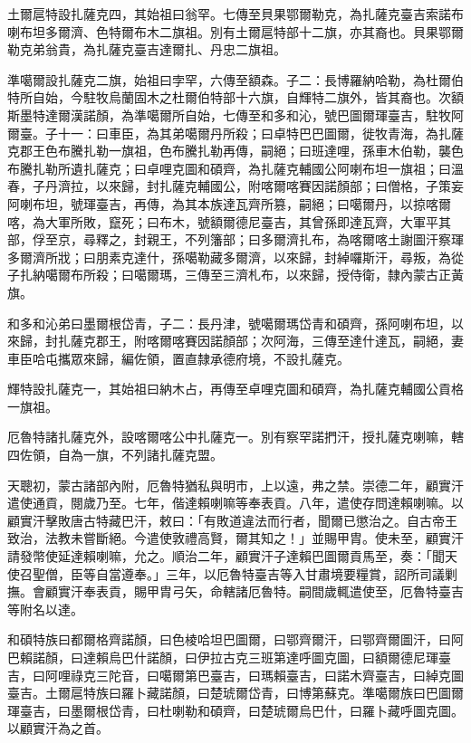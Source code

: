 \begin{pinyinscope}
土爾扈特設扎薩克四，其始祖曰翁罕。七傳至貝果鄂爾勒克，為扎薩克臺吉索諾布喇布坦多爾濟、色特爾布木二旗祖。別有土爾扈特部十二旗，亦其裔也。貝果鄂爾勒克弟翁貴，為扎薩克臺吉達爾扎、丹忠二旗祖。

準噶爾設扎薩克二旗，始祖曰孛罕，六傳至額森。子二：長博羅納哈勒，為杜爾伯特所自始，今駐牧烏蘭固木之杜爾伯特部十六旗，自輝特二旗外，皆其裔也。次額斯墨特達爾漢諾顏，為準噶爾所自始，七傳至和多和沁，號巴圖爾琿臺吉，駐牧阿爾臺。子十一：曰車臣，為其弟噶爾丹所殺；曰卓特巴巴圖爾，徙牧青海，為扎薩克郡王色布騰扎勒一旗祖，色布騰扎勒再傳，嗣絕；曰班達哩，孫車木伯勒，襲色布騰扎勒所遺扎薩克；曰卓哩克圖和碩齊，為扎薩克輔國公阿喇布坦一旗祖；曰溫春，子丹濟拉，以來歸，封扎薩克輔國公，附喀爾喀賽因諾顏部；曰僧格，子策妄阿喇布坦，號琿臺吉，再傳，為其本族達瓦齊所篡，嗣絕；曰噶爾丹，以掠喀爾喀，為大軍所敗，竄死；曰布木，號額爾德尼臺吉，其曾孫即達瓦齊，大軍平其部，俘至京，尋釋之，封親王，不列籓部；曰多爾濟扎布，為喀爾喀土謝圖汗察琿多爾濟所戕；曰朋素克達什，孫噶勒藏多爾濟，以來歸，封綽囉斯汗，尋叛，為從子扎納噶爾布所殺；曰噶爾瑪，三傳至三濟札布，以來歸，授侍衛，隸內蒙古正黃旗。

和多和沁弟曰墨爾根岱青，子二：長丹津，號噶爾瑪岱青和碩齊，孫阿喇布坦，以來歸，封扎薩克郡王，附喀爾喀賽因諾顏部；次阿海，三傳至達什達瓦，嗣絕，妻車臣哈屯攜眾來歸，編佐領，置直隸承德府境，不設扎薩克。

輝特設扎薩克一，其始祖曰納木占，再傳至卓哩克圖和碩齊，為扎薩克輔國公貢格一旗祖。

厄魯特諸扎薩克外，設喀爾喀公中扎薩克一。別有察罕諾捫汗，授扎薩克喇嘛，轄四佐領，自為一旗，不列諸扎薩克盟。

天聰初，蒙古諸部內附，厄魯特猶私與明市，上以遠，弗之禁。崇德二年，顧實汗遣使通貢，閱歲乃至。七年，偕達賴喇嘛等奉表貢。八年，遣使存問達賴喇嘛。以顧實汗擊敗唐古特藏巴汗，敕曰：「有敗道違法而行者，聞爾已懲治之。自古帝王致治，法教未嘗斷絕。今遣使敦禮高賢，爾其知之！」並賜甲胄。使未至，顧實汗請發幣使延達賴喇嘛，允之。順治二年，顧實汗子達賴巴圖爾貢馬至，奏：「聞天使召聖僧，臣等自當遵奉。」三年，以厄魯特臺吉等入甘肅境要糧賞，詔所司議剿撫。會顧實汗奉表貢，賜甲胄弓矢，命轄諸厄魯特。嗣間歲輒遣使至，厄魯特臺吉等附名以達。

和碩特族曰都爾格齊諾顏，曰色棱哈坦巴圖爾，曰鄂齊爾汗，曰鄂齊爾圖汗，曰阿巴賴諾顏，曰達賴烏巴什諾顏，曰伊拉古克三班第達呼圖克圖，曰額爾德尼琿臺吉，曰阿哩祿克三陀音，曰噶爾第巴臺吉，曰瑪賴臺吉，曰諾木齊臺吉，曰綽克圖臺吉。土爾扈特族曰羅卜藏諾顏，曰楚琥爾岱青，曰博第蘇克。準噶爾族曰巴圖爾琿臺吉，曰墨爾根岱青，曰杜喇勒和碩齊，曰楚琥爾烏巴什，曰羅卜藏呼圖克圖。以顧實汗為之首。


\end{pinyinscope}
